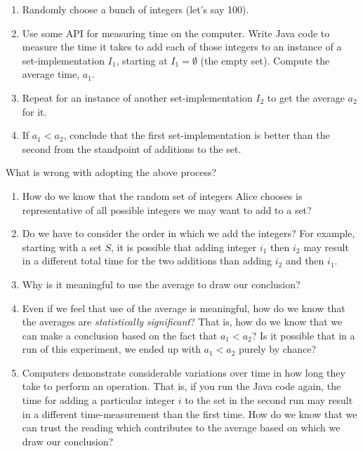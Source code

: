 \begin{enumerate}
\item Randomly choose a bunch of integers (let's say 100).

\item Use some API for measuring time on the computer.
Write Java code to measure the time it takes to add each of
those integers to an instance of a set-implementation $I_1$,
starting at $I_1 = \emptyset$ (the empty set). Compute the average time, $a_1$.

\item Repeat for an instance of another set-implementation
$I_2$ to get the average $a_2$ for it.

\item If $a_1 < a_2$, conclude that the first set-implementation
is better than the second from the standpoint of additions to the set.
\end{enumerate}

What is wrong with adopting the above process?

\begin{enumerate}
    \item How do we know that the random set of integers Alice chooses
	is representative of all possible integers we may want to
	add to a set?
    \item Do we have to consider the order in which we add
	the integers? For example, starting with a set $S$, it
	is possible that adding integer $i_1$ then $i_2$ may
	result in a different total time for the two additions
	than adding $i_2$ and then $i_1$.
    \item Why is it meaningful to use the average to draw our
	conclusion?
    \item Even if we feel that use of the average is meaningful,
	how do we know that the averages are \emph{statistically
	significant}? That is, how do we know that we can make a
	conclusion based on the fact that $a_1 < a_2$? Is it possible
	that in a run of this experiment, we ended up with
	$a_1 < a_2$ purely by chance?
    \item Computers demonstrate considerable variations over
	time in how long they take to perform an operation. That is,
	if you run the Java code again, the time for adding a 
	particular integer $i$ to the set in the second run may
	result in a different time-measurement than the first time.
	How do we know that we can trust the reading which contributes
	to the average based on which we draw our conclusion?
\end{enumerate}

